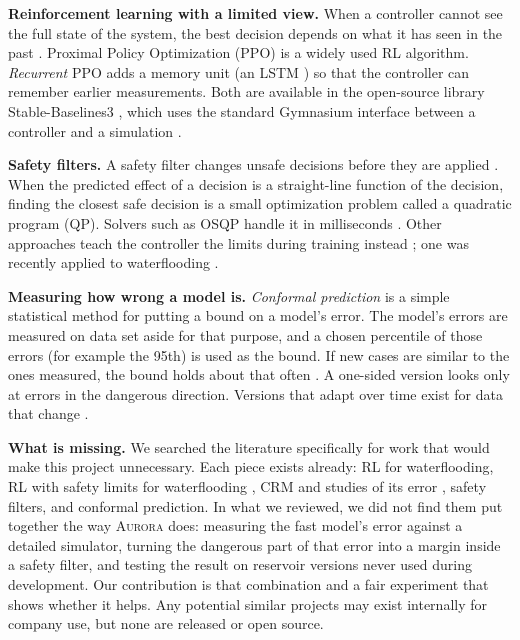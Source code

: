 \documentclass[11pt,letterpaper]{article}
\newcommand{\aur}{\textsc{Aurora}}
\begin{document}
\textbf{Reinforcement learning with a limited view.} When a controller cannot see the full
state of the system, the best decision depends on what it has seen in the past
\cite{kaelbling1998pomdp}. Proximal Policy Optimization (PPO) \cite{schulman2017ppo} is a
widely used RL algorithm. \emph{Recurrent} PPO adds a memory unit (an LSTM
\cite{hochreiter1997lstm}) so that the controller can remember earlier measurements. Both
are available in the open-source library Stable-Baselines3 \cite{raffin2021sb3}, which
uses the standard Gymnasium interface between a controller and a simulation
\cite{towers2024gymnasium}.

\textbf{Safety filters.} A safety filter changes unsafe decisions before they are applied
\cite{wabersich2021filter,dalal2018safety}. When the predicted effect of a decision is a
straight-line function of the decision, finding the closest safe decision is a small
optimization problem called a quadratic program (QP). Solvers such as OSQP handle it in
milliseconds \cite{stellato2020osqp}. Other approaches teach the controller the limits
during training instead \cite{achiam2017cpo}; one was recently applied to waterflooding
\cite{chen2025wcsac}.

\textbf{Measuring how wrong a model is.} \emph{Conformal prediction} is a simple
statistical method for putting a bound on a model's error. The model's errors are measured
on data set aside for that purpose, and a chosen percentile of those errors (for example
the 95th) is used as the bound. If new cases are similar to the ones measured, the bound
holds about that often \cite{lei2018conformal,angelopoulos2021gentle}. A one-sided version
looks only at errors in the dangerous direction. Versions that adapt over time exist for
data that change \cite{gibbs2021aci}.

\textbf{What is missing.} We searched the literature specifically for work that would make
this project unnecessary. Each piece exists already: RL for waterflooding, RL with safety
limits for waterflooding \cite{chen2025wcsac}, CRM and studies of its error
\cite{mamghaderi2021crm}, safety filters, and conformal prediction. In what we reviewed, we
did not find them put together the way \aur{} does: measuring the fast model's error
against a detailed simulator, turning the dangerous part of that error into a margin inside
a safety filter, and testing the result on reservoir versions never used during
development. Our contribution is that combination and a fair experiment that shows whether
it helps. Any potential similar projects may exist internally for company use, but none are 
released or open source.
\end{document}
